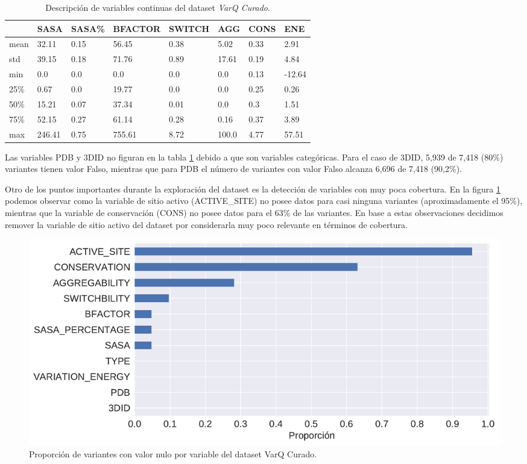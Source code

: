 \begin{table}[H]
\centering
\begin{tabular}{|l|l|l|l|l|l|l|l|}
\hline
 & SASA & SASA\% & BFACTOR & SWITCH & AGG & CONS & ENE \\ \hline
mean & 32.11 & 0.15 & 56.45 & 0.38 & 5.02 & 0.33 & 2.91 \\ \hline
std & 39.15 & 0.18 & 71.76 & 0.89 & 17.61 & 0.19 & 4.84 \\ \hline
min & 0.0 & 0.0 & 0.0 & 0.0 & 0.0 & 0.13 & -12.64 \\ \hline
25\% & 0.67 & 0.0 & 19.77 & 0.0 & 0.0 & 0.25 & 0.26 \\ \hline
50\% & 15.21 & 0.07 & 37.34 & 0.01 & 0.0 & 0.3 & 1.51 \\ \hline
75\% & 52.15 & 0.27 & 61.14 & 0.28 & 0.16 & 0.37 & 3.89 \\ \hline
max & 246.41 & 0.75 & 755.61 & 8.72 & 100.0 & 4.77 & 57.51 \\ \hline
\end{tabular}
\caption{Descripción de variables continuas del dataset \textit{VarQ Curado}.}
\label{tab:descripcion_varq}
\end{table}

Las variables PDB y 3DID no figuran en la tabla \ref{tab:descripcion_varq} debido a que son variables categóricas. Para el caso de 3DID, 5,939 de 7,418 (80\%) variantes tienen valor Falso, mientras que para PDB el número de variantes con valor Falso alcanza 6,696 de 7,418 (90,2\%). 



Otro de los puntos importantes durante la exploración del dataset es la detección de variables con muy poca cobertura. En la figura \ref{fig:proporcion_nulos_varq} podemos observar como la variable de sitio activo (ACTIVE\_SITE) no posee datos para casi ninguna variantes (aproximadamente el 95\%), mientras que la variable de conservación (CONS) no posee datos para el 63\% de las variantes. En base a estas observaciones decidimos remover la variable de sitio activo del dataset por considerarla muy poco relevante en términos de cobertura.

\begin{figure}[H]
    \centering
    \includegraphics[scale=0.55]{documents/latex/figures/3/proporcion_nulos.pdf}
    \caption{Proporción de variantes con valor nulo por variable del dataset VarQ Curado.}
    \label{fig:proporcion_nulos_varq}
\end{figure}


